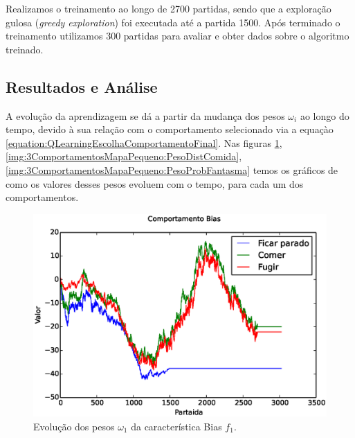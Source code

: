 Realizamos o treinamento ao longo de 2700 partidas, sendo que a exploração gulosa (\textit{greedy exploration}) foi executada até a partida 1500. Após terminado o treinamento utilizamos 300 partidas para avaliar e obter dados sobre o algoritmo treinado.


\subsection{Resultados e Análise}

A evolução da aprendizagem se dá a partir da mudança dos pesos $ \omega_i $ ao longo do tempo, devido à sua relação com o comportamento selecionado via a equaçào \ref{equation:QLearningEscolhaComportamentoFinal}. Nas figuras \ref{img:3ComportamentosMapaPequeno:PesoBias}, \ref{img:3ComportamentosMapaPequeno:PesoDistComida}, \ref{img:3ComportamentosMapaPequeno:PesoProbFantasma} temos os gráficos de como os valores desses pesos evoluem com o tempo, para cada um dos comportamentos.

\begin{figure}[H]
    \centering
    \includegraphics[width=\linewidth]{images/3_behaviors_small_map/weights____pol__Bias}
    \caption{Evolução dos pesos $ \omega_1 $ da característica Bias $ f_1 $.}
    \label{img:3ComportamentosMapaPequeno:PesoBias}
\end{figure}

